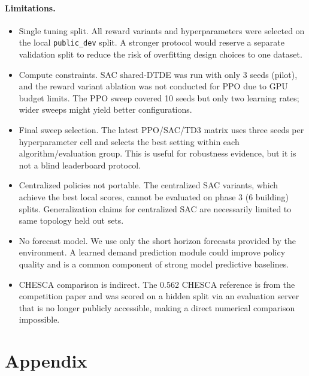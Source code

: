 \documentclass{article}
\begin{document}
\paragraph{Limitations.}
\begin{itemize}
    \item Single tuning split. All reward variants and hyperparameters were selected on the local \texttt{public\_dev} split. A stronger protocol would reserve a separate validation split to reduce the risk of overfitting design choices to one dataset.
    \item Compute constraints. SAC shared-DTDE was run with only 3 seeds (pilot), and the reward variant ablation was not conducted for PPO due to GPU budget limits. The PPO sweep covered 10 seeds but only two learning rates; wider sweeps might yield better configurations.
    \item Final sweep selection. The latest PPO/SAC/TD3 matrix uses three seeds per hyperparameter cell and selects the best setting within each algorithm/evaluation group. This is useful for robustness evidence, but it is not a blind leaderboard protocol.
    \item Centralized policies not portable. The centralized SAC variants, which achieve the best local scores, cannot be evaluated on phase 3 (6 building) splits. Generalization claims for centralized SAC are necessarily limited to same topology held out sets.
    \item No forecast model. We use only the short horizon forecasts provided by the environment. A learned demand prediction module could improve policy quality and is a common component of strong model predictive baselines.
    \item CHESCA comparison is indirect. The 0.562 CHESCA reference is from the competition paper \citep{pinto2024citylearn} and was scored on a hidden split via an evaluation server that is no longer publicly accessible, making a direct numerical comparison impossible.
\end{itemize}

{\footnotesize



}

\section*{Appendix}
\end{document}
